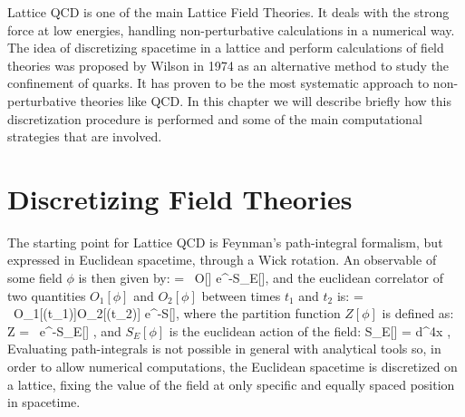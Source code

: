 
Lattice QCD is one of the main Lattice Field Theories. It deals with the strong force at low energies, handling non-perturbative calculations in a numerical way. The idea of discretizing spacetime in a lattice and perform calculations of field theories was proposed by Wilson in 1974 \cite{wilson_confinement_1974} as an alternative method to study the confinement of quarks. It has proven to be the most systematic approach to non-perturbative theories like QCD. In this chapter we will describe briefly how this discretization procedure is performed and some of the main computational strategies that are involved.

\section{Discretizing Field Theories}

The starting point for Lattice QCD is Feynman's path-integral formalism, but expressed in Euclidean spacetime, through a Wick rotation. An observable of some field $\phi$ is then given by:
\beq
{} =  \int \D[\phi] ~O[\phi] e^{-S_E[\phi]},
\label{lattice:obs_base}
\eeq
and the euclidean correlator of two quantities $O_1[\phi]$ and $O_2[\phi]$ between times $t_1$ and $t_2$ is:
\beq
{} =  \int \D[\phi] ~O_1[\phi(t_1)]O_2[\phi(t_2)] e^{-S[\phi]},
\label{lattice:correlator}
\eeq
where the partition function $Z[\phi]$ is defined as:
\beq
	Z = \int \D[\phi] ~e^{-S_E[\phi]} ,
\eeq
and $S_E[\phi]$ is the euclidean action of the field:
\beq
S_E[\phi] = \int d^4x \Lagr [\phi] ,
\eeq
Evaluating path-integrals is not possible in general with analytical tools so, in order to allow numerical computations, the Euclidean spacetime is discretized on a lattice, fixing the value of the field at only specific and equally spaced position in spacetime. 


